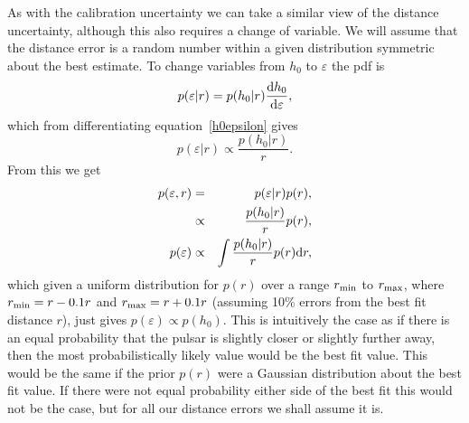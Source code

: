 As with the calibration uncertainty we can take a similar view of the distance uncertainty,
although this also requires a change of variable. We will assume that the distance error is a
random number within a given distribution symmetric about the best estimate. To change variables
from $h_0$ to $\varepsilon$ the pdf is
\begin{equation}
p(\varepsilon|r) = p(h_0|r)\frac{{\rm d}h_0}{{\rm d}\varepsilon},
\end{equation}
which from differentiating equation~\ref{h0epsilon} gives
\begin{equation}
p(\varepsilon|r) \propto \frac{p(h_0|r)}{r}.
\end{equation}
From this we get
\begin{eqnarray}
p(\varepsilon,r) & = & p(\varepsilon|r)p(r), \nonumber \\
& \propto & \frac{p(h_0|r)}{r}p(r), \nonumber \\
p(\varepsilon) & \propto & \int \frac{p(h_0|r)}{r}p(r) {\rm d}r,
\end{eqnarray}
which given a uniform distribution for $p(r)$ over a range $r_{\rm min}$ to $r_{\rm max}$,
where $r_{\rm min} = r - 0.1r$ and $r_{\rm max} = r + 0.1r$ (assuming 10\% errors from the best
fit distance $r$), just gives $p(\varepsilon) \propto p(h_0)$. This is intuitively the case as if
there is an equal probability that the pulsar is slightly closer or slightly further away, then the
most probabilistically likely value would be the best fit value. This would be the same if  the
prior $p(r)$ were a Gaussian distribution about the best fit value. If there were not equal
probability either side of the best fit this would not be the case, but for all our distance errors
we shall assume it is.


